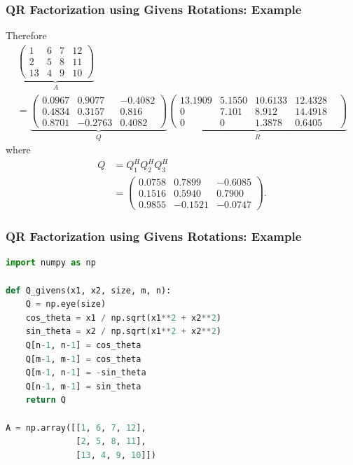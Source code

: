 \documentclass{beamer}
\begin{document}
\begin{frame}\frametitle{QR Factorization using Givens Rotations: Example}
	Therefore
	{\footnotesize
	\begin{multline*}
	\underbrace{
		\begin{pmatrix}
 			1 & 6 & 7 & 12 \\
 			2 & 5 & 8 & 11 \\
 			13 & 4 & 9 & 10
		\end{pmatrix}
	}_{A}
	\\
	=
	\underbrace{
		\begin{pmatrix}
			0.0967 & 0.9077 & -0.4082 \\
		 	0.4834 & 0.3157 & 0.816 \\
			0.8701 & -0.2763 & 0.4082		
		\end{pmatrix}
	}_{Q}
	\underbrace{
		\begin{pmatrix}
			13.1909 & 5.1550 & 10.6133 & 12.4328 & \\
			0 & 7.101 & 8.912 & 14.4918 \\
			0 & 0  & 1.3878 & 0.6405 
		\end{pmatrix}
	}_R
	\end{multline*}
	}
	where
	\begin{align*}
		Q &= Q_1^H Q_2^H Q_3^H \\
		  &=
		  	\begin{pmatrix}
				0.0758 & 0.7899 & -0.6085 \\
				0.1516 & 0.5940 & 0.7900 \\
				0.9855 & -0.1521 & -0.0747
		  	\end{pmatrix}.
	\end{align*}
\end{frame}

\begin{frame}[fragile]\frametitle{QR Factorization using Givens Rotations: Example}
\begin{lstlisting}[language=Python]
import numpy as np

def Q_givens(x1, x2, size, m, n):
    Q = np.eye(size)
    cos_theta = x1 / np.sqrt(x1**2 + x2**2)
    sin_theta = x2 / np.sqrt(x1**2 + x2**2)
    Q[n-1, n-1] = cos_theta
    Q[m-1, m-1] = cos_theta
    Q[m-1, n-1] = -sin_theta
    Q[n-1, m-1] = sin_theta
    return Q

A = np.array([[1, 6, 7, 12],
              [2, 5, 8, 11],
              [13, 4, 9, 10]])
              
\end{lstlisting}
\end{frame}
\end{document}
